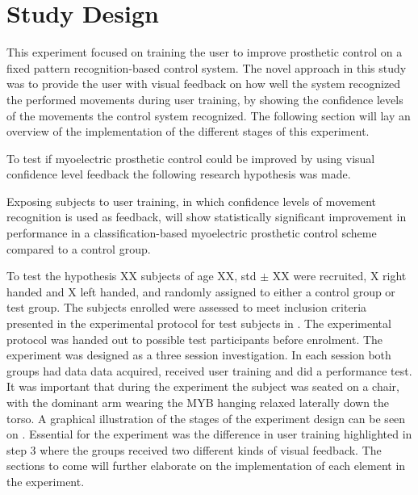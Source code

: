 \section{Study Design} \label{sec:M:studyDesign}

This experiment focused on training the user to improve prosthetic control on a fixed pattern recognition-based control system. The novel approach in this study was to provide the user with visual feedback on how well the system recognized the performed movements during user training, by showing the confidence levels of the movements the control system recognized. The following section will lay an overview of the implementation of the different stages of this experiment.

To test if myoelectric prosthetic control could be improved by using visual confidence level feedback the following research hypothesis was made.  
\begin{center}
	Exposing subjects to user training, in which confidence levels of movement recognition is used as feedback, will show statistically significant improvement in performance in a classification-based myoelectric prosthetic control scheme compared to a control group.
\end{center}


To test the hypothesis XX subjects of age XX, std $\pm$ XX were recruited, X right handed and X left handed, and randomly assigned to either a control group or test group. The subjects enrolled were assessed to meet inclusion criteria presented in the experimental protocol for test subjects in . The experimental protocol was handed out to possible test participants before enrolment. The experiment was designed as a three session investigation. In each session both groups had data data acquired, received user training and did a performance test. It was important that during the experiment the subject was seated on a chair, with the dominant arm wearing the MYB hanging relaxed laterally down the torso. A graphical illustration of the stages of the experiment design can be seen on . Essential for the experiment was the difference in user training highlighted in step 3 where the groups received two different kinds of visual feedback. The sections to come will further elaborate on the implementation of each element in the experiment.
 
